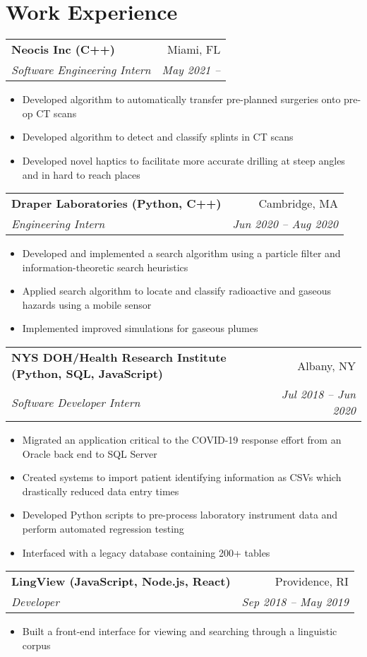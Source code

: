 \documentclass[letterpaper,11pt]{article}
\makeatletter
\newcommand{\resumeItem}[2]{
  \item\small{
    \textbf{#1}{#2 \vspace{-5pt}}
  }
}
\newcommand{\resumeSubheading}[4]{
    \vspace{3pt} 
    \begin{tabular*}{0.97\textwidth}{l@{\extracolsep{\fill}}r}
      \textbf{#1} & #2 \\
      \textit{\small#3} & \textit{\small #4} \\
    \end{tabular*}\vspace{-3pt}
}
\newcommand{\resumeSubHeadingListStart}{}
\newcommand{\resumeSubHeadingListEnd}{}
\newcommand{\resumeItemListStart}{\begin{itemize}}
\newcommand{\resumeItemListEnd}{\end{itemize}}
\makeatother
\begin{document}
\section{Work Experience}
  \resumeSubHeadingListStart
  \resumeSubheading{Neocis Inc (C++)}{Miami, FL}
    {Software Engineering Intern}{May 2021 -- }
      \resumeItemListStart
        \resumeItem{}
      {Developed algorithm to automatically transfer pre-planned surgeries onto pre-op CT scans}
        \resumeItem{}
      {Developed algorithm to detect and classify splints in CT scans}
        \resumeItem{}
      {Developed novel haptics to facilitate more accurate drilling at steep angles and in hard to reach places}
      \resumeItemListEnd
  \resumeSubheading{Draper Laboratories (Python, C++)}
    {Cambridge, MA}{Engineering Intern}{Jun 2020 -- Aug 2020}
      \resumeItemListStart
        \resumeItem{}
        {Developed and implemented a search algorithm using a particle filter and information-theoretic search heuristics}
        \resumeItem{}
        {Applied search algorithm to locate and classify radioactive and gaseous hazards using a mobile sensor} 
        \resumeItem{}
        {Implemented improved simulations for gaseous plumes}
      \resumeItemListEnd
      \resumeSubheading{NYS DOH/Health Research Institute (Python, SQL, JavaScript)}
    {Albany, NY}{Software Developer Intern}{Jul 2018 -- Jun 2020}
      \resumeItemListStart
        \resumeItem{}
        {Migrated an application critical to the COVID-19 response effort from an Oracle back end to SQL Server}
        \resumeItem{}
        {Created systems to import patient identifying information as CSVs which drastically reduced data entry times}
        \resumeItem{}
        {Developed Python scripts to pre-process laboratory instrument data and perform automated regression testing}
        \resumeItem{}
        {Interfaced with a legacy database containing 200+ tables}
      \resumeItemListEnd
    \resumeSubheading{LingView (JavaScript, Node.js, React)}{Providence, RI}{Developer}{Sep 2018 -- May 2019}
      \resumeItemListStart
        \resumeItem{}
        {Built a front-end interface for viewing and searching through a linguistic corpus}
      \resumeItemListEnd
  \resumeSubHeadingListEnd
\end{document}
